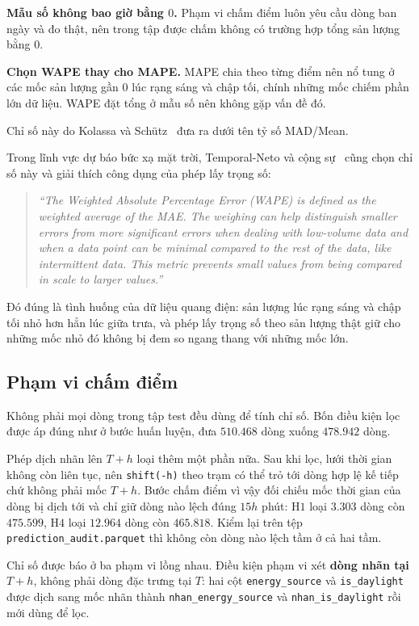 \documentclass[12pt, a4paper]{report}
\begin{document}
\textbf{Mẫu số không bao giờ bằng $0$.} Phạm vi chấm điểm luôn yêu cầu dòng ban ngày và đo
thật, nên trong tập được chấm không có trường hợp tổng sản lượng bằng $0$.

\textbf{Chọn WAPE thay cho MAPE.} MAPE chia theo từng điểm nên nổ tung ở các mốc sản
lượng gần $0$ lúc rạng sáng và chập tối, chính những mốc chiếm phần lớn dữ liệu. WAPE đặt
tổng ở mẫu số nên không gặp vấn đề đó.

Chỉ số này do Kolassa và Schütz~\cite{kolassa2007mad} đưa ra dưới tên tỷ số MAD/Mean.

Trong lĩnh vực dự báo bức xạ mặt trời, Temporal-Neto và cộng sự~\cite{pin2025wape} cũng chọn
chỉ số này và giải thích công dụng của phép lấy trọng số:

\begin{quote}\small
\textit{``The Weighted Absolute Percentage Error (WAPE) is defined as the weighted average of
the MAE. The weighing can help distinguish smaller errors from more significant errors when
dealing with low-volume data and when a data point can be minimal compared to the rest of the
data, like intermittent data. This metric prevents small values from being compared in scale to
larger values.''}
\end{quote}

Đó đúng là tình huống của dữ liệu quang điện: sản lượng lúc rạng sáng và chập tối nhỏ hơn hẳn
lúc giữa trưa, và phép lấy trọng số theo sản lượng thật giữ cho những mốc nhỏ đó không bị đem so
ngang thang với những mốc lớn.


\FloatBarrier
\subsection{Phạm vi chấm điểm}

Không phải mọi dòng trong tập test đều dùng để tính chỉ số. Bốn điều kiện lọc được áp đúng như
ở bước huấn luyện, đưa $510.468$ dòng xuống $478.942$ dòng.

Phép dịch nhãn lên $T{+}h$ loại thêm một phần nữa. Sau khi lọc, lưới thời gian không còn liên
tục, nên \texttt{shift(-h)} theo trạm có thể trỏ tới dòng hợp lệ kế tiếp chứ không phải mốc
$T{+}h$. Bước chấm điểm vì vậy đối chiếu mốc thời gian của dòng bị dịch tới và chỉ giữ dòng
nào lệch đúng $15h$ phút: H$1$ loại $3.303$ dòng còn $\mathbf{475.599}$, H$4$ loại $12.964$
dòng còn $\mathbf{465.818}$. Kiểm lại trên tệp \texttt{prediction\_audit.parquet} thì không còn
dòng nào lệch tầm ở cả hai tầm.

Chỉ số được báo ở ba phạm vi lồng nhau. Điều kiện phạm vi xét \textbf{dòng nhãn tại $T{+}h$},
không phải dòng đặc trưng tại $T$: hai cột \texttt{energy\_source} và \texttt{is\_daylight} được dịch
sang mốc nhãn thành \texttt{nhan\_energy\_source} và \texttt{nhan\_is\_daylight} rồi mới dùng để lọc.
\end{document}
